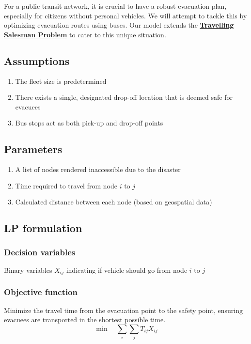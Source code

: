 \documentclass[12pt]{article}
\begin{document}
For a public transit network, it is crucial to have a robust evacuation
plan, especially for citizens without personal vehicles. We will attempt
to tackle this by optimizing evacuation routes using buses. Our model
extends the
\textbf{\href{https://en.wikipedia.org/wiki/Travelling_salesman_problem}{Travelling
            Salesman Problem}} to cater to this unique situation.

\subsection{Assumptions}\label{assumptions}

\begin{enumerate}
      \item
            The fleet size is predetermined
      \item
            There exists a single, designated drop-off location that is deemed
            safe for evacuees
      \item
            Bus stops act as both pick-up and drop-off points
\end{enumerate}

\subsection{Parameters}\label{parameters}
\begin{enumerate}
      \item
            A list of nodes rendered inaccessible due to the disaster
      \item
            Time required to travel from node $i$ to $j$
      \item
            Calculated distance between each node (based on geospatial data)
\end{enumerate}
\subsection{LP formulation}\label{lp-formulation}

\subsubsection{Decision variables}\label{decision-variables}
Binary variables $X_{ij}$ indicating if vehicle should go from node $i$ to $j$

\subsubsection{Objective function}\label{objective-function}
Minimize the travel time from the evacuation point to the safety point, ensuring evacuees are transported in the shortest possible time.
$$
      \min \quad \sum_{i}\sum_{j} T_{ij} X_{ij}
$$
\end{document}
